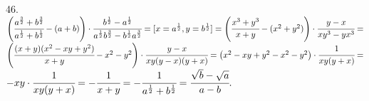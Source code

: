 46. $\left(\cfrac{a^{\frac{3}{2}}+b^{\frac{3}{2}}}{a^{\frac{1}{2}}+b^{\frac{1}{2}}}-(a+b)\right)\cdot\cfrac{b^{\frac{1}{2}}-a^{\frac{1}{2}}}{a^{\frac{1}{2}}b^{\frac{3}{2}}-b^{\frac{1}{2}}a^{\frac{3}{2}}}=
[x=a^{\frac{1}{2}}, y=b^{\frac{1}{2}}]=
\left(\cfrac{x^3+y^3}{x+y}-(x^2+y^2)\right)\cdot\cfrac{y-x}{xy^3-yx^3}=$\\$\left(\cfrac{(x+y)(x^2-xy+y^2)}{x+y}-x^2-y^2\right)\cdot\cfrac{y-x}{xy(y-x)(y+x)}=
\left(x^2-xy+y^2-x^2-y^2\right)\cdot\cfrac{1}{xy(y+x)}=$\\$-xy\cdot\cfrac{1}{xy(y+x)}=-\cfrac{1}{x+y}=-\cfrac{1}{a^{\frac{1}{2}}+b^{\frac{1}{2}}}=\cfrac{\sqrt{b}-\sqrt{a}}{a-b}.$\\
